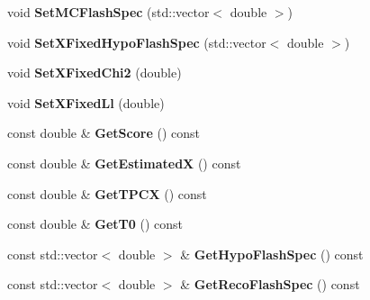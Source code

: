 \begin{DoxyCompactItemize}
\item 
\hypertarget{classubana_1_1FlashMatch_a0ba760ff15c8e7451a8c5a85d34e0e27}{void {\bfseries \-Set\-M\-C\-Flash\-Spec} (std\-::vector$<$ double $>$)}\label{classubana_1_1FlashMatch_a0ba760ff15c8e7451a8c5a85d34e0e27}

\item 
\hypertarget{classubana_1_1FlashMatch_a1773e321ebff8817365b2cb92585c377}{void {\bfseries \-Set\-X\-Fixed\-Hypo\-Flash\-Spec} (std\-::vector$<$ double $>$)}\label{classubana_1_1FlashMatch_a1773e321ebff8817365b2cb92585c377}

\item 
\hypertarget{classubana_1_1FlashMatch_a35ee14c73871353d049c507e6cee5194}{void {\bfseries \-Set\-X\-Fixed\-Chi2} (double)}\label{classubana_1_1FlashMatch_a35ee14c73871353d049c507e6cee5194}

\item 
\hypertarget{classubana_1_1FlashMatch_aab5f4c77216479d38f07ffaf8d23b607}{void {\bfseries \-Set\-X\-Fixed\-Ll} (double)}\label{classubana_1_1FlashMatch_aab5f4c77216479d38f07ffaf8d23b607}

\item 
\hypertarget{classubana_1_1FlashMatch_a9609a7e919011d3dca51e4d9aaeb96f0}{const double \& {\bfseries \-Get\-Score} () const }\label{classubana_1_1FlashMatch_a9609a7e919011d3dca51e4d9aaeb96f0}

\item 
\hypertarget{classubana_1_1FlashMatch_aa3d7773875587f0f0b3484436453e9eb}{const double \& {\bfseries \-Get\-Estimated\-X} () const }\label{classubana_1_1FlashMatch_aa3d7773875587f0f0b3484436453e9eb}

\item 
\hypertarget{classubana_1_1FlashMatch_a2f60d3ffbf76195a2daa7c607ae08c89}{const double \& {\bfseries \-Get\-T\-P\-C\-X} () const }\label{classubana_1_1FlashMatch_a2f60d3ffbf76195a2daa7c607ae08c89}

\item 
\hypertarget{classubana_1_1FlashMatch_a22f4fe66c3e9bdfc4e9e0ab8644f0d7e}{const double \& {\bfseries \-Get\-T0} () const }\label{classubana_1_1FlashMatch_a22f4fe66c3e9bdfc4e9e0ab8644f0d7e}

\item 
\hypertarget{classubana_1_1FlashMatch_a7d0f47481b725ba769cb13946d5320be}{const std\-::vector$<$ double $>$ \& {\bfseries \-Get\-Hypo\-Flash\-Spec} () const }\label{classubana_1_1FlashMatch_a7d0f47481b725ba769cb13946d5320be}

\item 
\hypertarget{classubana_1_1FlashMatch_ab9728fef08e709b602a3a2ba25c6c17c}{const std\-::vector$<$ double $>$ \& {\bfseries \-Get\-Reco\-Flash\-Spec} () const }\label{classubana_1_1FlashMatch_ab9728fef08e709b602a3a2ba25c6c17c}


\end{DoxyCompactItemize}
